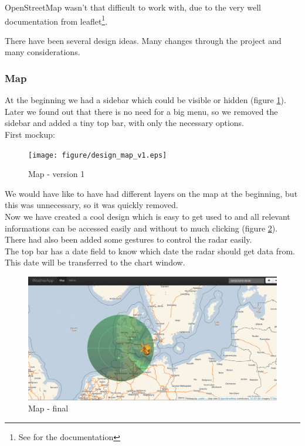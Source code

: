 OpenStreetMap wasn't that difficult to work with, due to the very well documentation from leaflet\footnote{See \cite{leaflet} for the documentation}.

There have been several design ideas. Many changes through the project and many considerations.

\subsubsection{Map}
At the beginning we had a sidebar which could be visible or hidden (figure \ref{fig:map_v1}). Later we found out that there is no need for a big menu, so we removed the sidebar and added a tiny top bar, with only the necessary options.\\
First mockup:
\begin{figure}[htbp]
   \centering
   \texttt{[image: figure/design\_map\_v1.eps]}
   \caption{Map - version 1}
   \label{fig:map_v1}
\end{figure}

We would have like to have had different layers on the map at the beginning, but this was unnecessary, so it was quickly removed.\\
Now we have created a cool design which is easy to get used to and all relevant informations can be accessed easily and without to much clicking (figure \ref{fig:map_final}).
There had also been added some gestures to control the radar easily.\\
The top bar has a date field to know which date the radar should get data from. This date will be transferred to the chart window.

\begin{figure}[htbp]
   \centering
   \includegraphics[width=1\linewidth]{figure/design_map_final.eps}
   \caption{Map - final}
   \label{fig:map_final}
\end{figure}

